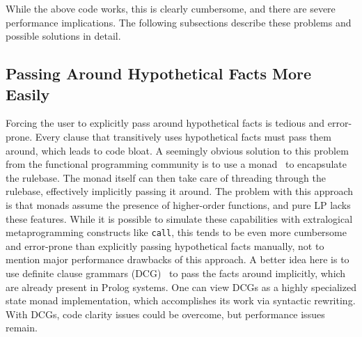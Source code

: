 While the above code works, this is clearly cumbersome, and there are severe performance implications.
The following subsections describe these problems and possible solutions in detail.

\subsection{Passing Around Hypothetical Facts More Easily}
Forcing the user to explicitly pass around hypothetical facts is tedious and error-prone.
Every clause that transitively uses hypothetical facts must pass them around, which leads to code bloat.
A seemingly obvious solution to this problem from the functional programming community is to use a monad~\cite{Moggi:1989:CLM:77350.77353} to encapsulate the rulebase.
The monad itself can then take care of threading through the rulebase, effectively implicitly passing it around.
The problem with this approach is that monads assume the presence of higher-order functions, and pure LP lacks these features.
While it is possible to simulate these capabilities with extralogical metaprogramming constructs like \texttt{call}, this tends to be even more cumbersome and error-prone than explicitly passing hypothetical facts manually, not to mention major performance drawbacks of this approach.
A better idea here is to use definite clause grammars (DCG)~\cite{Abramson:1984:DCT:901674} to pass the facts around implicitly, which are already present in Prolog systems.
One can view DCGs as a highly specialized state monad implementation, which accomplishes its work via syntactic rewriting.
With DCGs, code clarity issues could be overcome, but performance issues remain.

